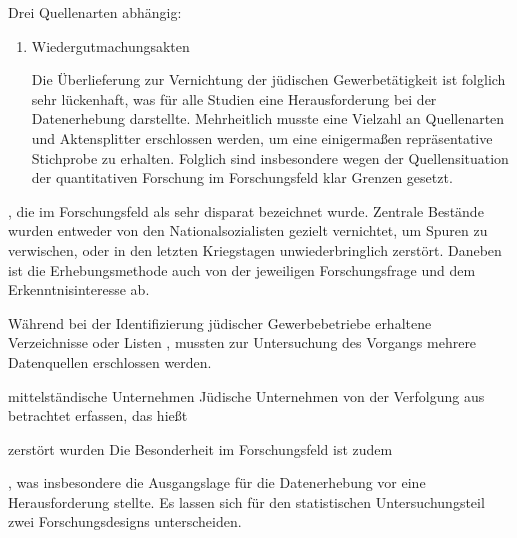 Drei Quellenarten abhängig: 

\begin{enumerate}
    \item 
    
    Wiedergutmachungsakten
    
    Die Überlieferung zur Vernichtung der jüdischen Gewerbetätigkeit ist folglich sehr lückenhaft, was für alle Studien eine Herausforderung bei der Datenerhebung darstellte. Mehrheitlich musste eine Vielzahl an Quellenarten und Aktensplitter erschlossen werden, um eine einigermaßen repräsentative Stichprobe zu erhalten. Folglich sind insbesondere wegen der Quellensituation der quantitativen Forschung im Forschungsfeld klar Grenzen gesetzt. 
\end{enumerate}





, die im Forschungsfeld als sehr disparat bezeichnet wurde. Zentrale Bestände wurden entweder von den Nationalsozialisten gezielt vernichtet, um Spuren zu verwischen, oder in den letzten Kriegstagen unwiederbringlich zerstört. Daneben ist die Erhebungsmethode auch von der jeweiligen Forschungsfrage und dem Erkenntnisinteresse ab. 


Während bei der Identifizierung jüdischer Gewerbebetriebe erhaltene Verzeichnisse oder Listen , mussten zur Untersuchung des Vorgangs mehrere Datenquellen erschlossen werden.





mittelständische Unternehmen
Jüdische Unternehmen von der Verfolgung aus betrachtet erfassen, das hießt


zerstört wurden Die Besonderheit im Forschungsfeld ist zudem




, was insbesondere die Ausgangslage für die Datenerhebung vor eine Herausforderung stellte. 
Es lassen sich für den statistischen Untersuchungsteil zwei Forschungsdesigns unterscheiden.

